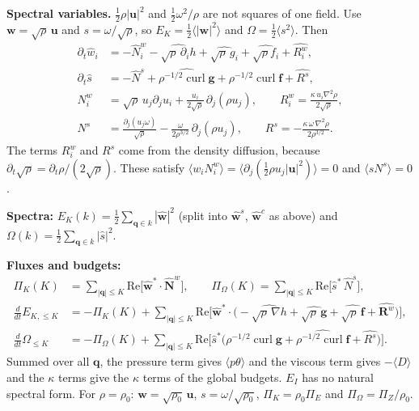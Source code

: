 \documentclass[11pt]{article}
\newcommand{\avg}[1]{\langle #1\rangle}
\newcommand{\curl}{\operatorname{curl}}
\begin{document}
\textbf{Spectral variables.} $\tfrac12\rho|\bm u|^2$ and $\tfrac12\omega^2/\rho$ are not squares of one field. Use
$\bm w=\sqrt\rho\,\bm u$ and $s=\omega/\sqrt\rho$, so $E_K=\tfrac12\avg{|\bm w|^2}$ and $\Omega=\tfrac12\avg{s^2}$. Then
\begin{align}
\partial_t\hat w_i&=-\hat N^w_i-\widehat{\sqrt\rho\,\partial_ih}+\widehat{\sqrt\rho\,g_i}+\widehat{\sqrt\rho f_i}+\widehat{R^w_i},\\
\partial_t\hat s&=-\hat N^s+\widehat{\rho^{-1/2}\curl\bm g}+\widehat{\rho^{-1/2}\curl\bm f}+\widehat{R^s},\\
N^w_i&=\sqrt\rho\,u_j\partial_ju_i+\frac{u_i}{2\sqrt\rho}\,\partial_j(\rho u_j),\qquad
R^w_i=\frac{\kappa\,u_i\nabla^2\rho}{2\sqrt\rho},\\
N^s&=\frac{\partial_j(u_j\omega)}{\sqrt\rho}-\frac{\omega}{2\rho^{3/2}}\,\partial_j(\rho u_j),\qquad
R^s=-\frac{\kappa\,\omega\,\nabla^2\rho}{2\rho^{3/2}}.
\end{align}
The terms $R^w_i$ and $R^s$ come from the density diffusion, because $\partial_t\sqrt\rho=\partial_t\rho/(2\sqrt\rho)$.
These satisfy $\avg{w_iN^w_i}=\avg{\partial_j(\tfrac12\rho u_j|\bm u|^2)}=0$ and $\avg{sN^s}=0$.

\textbf{Spectra:} $E_K(k)=\tfrac12\sum_{\bm q\in k}|\hat{\bm w}|^2$ (split into $\hat{\bm w}^s$, $\hat{\bm w}^c$ as above) and $\Omega(k)=\tfrac12\sum_{\bm q\in k}|\hat s|^2$.

\textbf{Fluxes and budgets:}
\begin{align}
\Pi_K(K)&=\sum_{|\bm q|\le K}\mathrm{Re}\big[\hat{\bm w}^*\cdot\hat{\bm N}^w\big],\qquad
\Pi_\Omega(K)=\sum_{|\bm q|\le K}\mathrm{Re}\big[\hat s^*\,\hat N^s\big],\\
\frac{d}{dt}E_{K,\le K}&=-\Pi_K(K)+\sum_{|\bm q|\le K}\mathrm{Re}\Big[\hat{\bm w}^*\cdot\big(-\widehat{\sqrt\rho\,\nabla h}+\widehat{\sqrt\rho\,\bm g}+\widehat{\sqrt\rho\,\bm f}+\widehat{\bm R^w}\big)\Big],\\
\frac{d}{dt}\Omega_{\le K}&=-\Pi_\Omega(K)+\sum_{|\bm q|\le K}\mathrm{Re}\Big[\hat s^*\big(\widehat{\rho^{-1/2}\curl\bm g}+\widehat{\rho^{-1/2}\curl\bm f}+\widehat{R^s}\big)\Big].
\end{align}
Summed over all $\bm q$, the pressure term gives $\avg{p\theta}$ and the viscous term gives $-\avg D$ and the $\kappa$ terms give the $\kappa$ terms of the global budgets. $E_I$ has no natural spectral form.
For $\rho=\rho_0$: $\bm w=\sqrt{\rho_0}\,\bm u$, $s=\omega/\sqrt{\rho_0}$, $\Pi_K=\rho_0\Pi_E$ and $\Pi_\Omega=\Pi_Z/\rho_0$.
\end{document}
